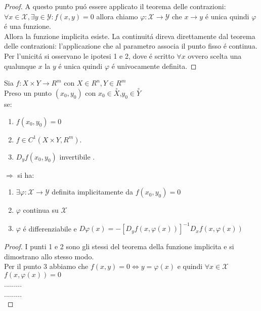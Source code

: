 \begin{proof}
	A questo punto pu\'o essere applicato il teorema delle contrazioni:\\
	$\forall x \in \mathcal{X}, \exists y \in\mathcal{Y}: f(x,y)=0$ allora chiamo $\varphi:\mathcal{X}\rightarrow\mathcal{Y}$ che $x\rightarrow y$ \'e unica quindi $\varphi$ \'e una funzione.\\
	Allora la funzione implicita esiste. La continuit\'a direva direttamente dal teorema delle contrazioni: l'applicazione che al parametro associa il punto fisso \'e continua.\\
	Per l'unicit\'a si osservano le ipotesi 1 e 2, dove \'e scritto $\forall x$ ovvero scelta una qualunque $x$ la $y$ \'e unica quindi $\varphi$ \'e univocamente definita.
	  
\end{proof}
\proposition
Sia $f:X\times Y\rightarrow R^m$ con $X\in R^n, Y\in R^m$\\
Preso un punto $(x_0,y_0)$ con $x_0\in \overset{\circ}{X}$,$y_0\in \overset{\circ}{Y}$\\
se:
\begin{enumerate}
	\item $f(x_0,y_0)=0$
	\item $f\in C^1(X\times Y,R^m)$.
	\item $D_yf(x_0,y_0)$ invertibile .
\end{enumerate}
$\Rightarrow $ si ha:\\
\begin{enumerate}
	\item $\exists \varphi: \mathcal{X}\rightarrow\mathcal{Y}$ definita implicitamente da $f(x_0,y_0)=0$
	\item $\varphi$ continua su $\mathcal{X}$
	\item $\varphi$ \'e differenziabile e $D\varphi(x)=-[D_yf(x,\varphi(x))]^{-1}D_xf(x,\varphi(x))$
\end{enumerate}
\begin{proof}
	I punti 1 e 2 sono gli stessi del teorema della funzione implicita e si dimostrano allo stesso modo.\\
	Per il punto 3 abbiamo che $f(x,y)=0\Leftrightarrow y=\varphi(x)$ e quindi $\forall x\in \mathcal{X}$ $f(x,\varphi(x))=0$\\
	.........\\
	.........\\
	
\end{proof}

